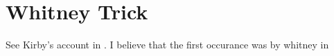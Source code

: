 \section{Whitney Trick}

See Kirby's account in \cite{kirby_2013}.
I believe that the first occurance was by whitney in \cite{whitney_1944}


